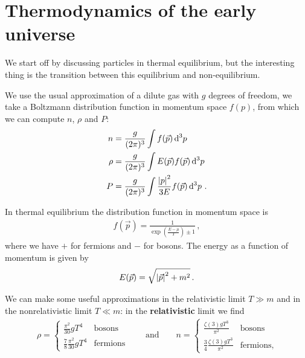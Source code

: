 \documentclass[main.tex]{subfiles}
\begin{document}
\section{Thermodynamics of the early universe}


We start off by discussing particles in thermal equilibrium, but the interesting thing is the transition between this equilibrium and non-equilibrium.

We use the usual approximation of a dilute gas with \(g\) degrees of freedom, we take a Boltzmann distribution function in momentum space \(f(p)\), from which we can compute \(n\), \(\rho \) and \(P\): 
%
\begin{align}
n &= \frac{g}{(2\pi )^3} \int f(\vec{p}) \dd[3]{p} \\
\rho  &= \frac{g}{(2\pi )^3} \int E(\vec{p}) f(\vec{p}) \dd[3]{p} \\
P  &= \frac{g}{(2\pi )^3} \int \frac{\abs{p}^2}{3E} f(\vec{p}) \dd[3]{p} 
\,.
\end{align}

In thermal equilibrium the distribution function in momentum space is 
%
\begin{align}
f(\vec{p}) = \frac{1}{\exp(\frac{E-\mu }{T}) \pm 1}
\,,
\end{align}
%
where we have \(+\) for fermions and \(-\) for bosons.
The energy as a function of momentum is given by 
%
\begin{align}
E(\vec{p}) = \sqrt{\abs{\vec{p}}^2 + m^2}
\,.
\end{align}

We can make some useful approximations in the relativistic limit \(T \gg m\) and in the nonrelativistic limit \(T \ll m\): 
in the \textbf{relativistic} limit we find 
%
\begin{align} \label{eq:density-number-density-relativistic-limit}
\rho = 
\begin{cases}
  \displaystyle \frac{\pi^2}{30 } g T^{4} &  \text{bosons} \\
  \displaystyle \frac{7}{8} \frac{\pi^2}{30 } g T^{4} &  \text{fermions}
\end{cases}
\qquad \text{and} \qquad
n = 
\begin{cases}
  \displaystyle \frac{\zeta (3) g T^{3}}{\pi^2} &  \text{bosons} \\
  \displaystyle \frac{3}{4}\frac{\zeta (3) g T^{3}}{\pi^2} &  \text{fermions},
\end{cases}
\end{align}
\end{document}
